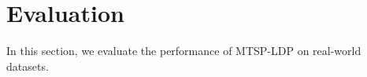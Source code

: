 \section{Evaluation} \label{sec:Evaluation}

In this section, we evaluate the performance of MTSP-LDP on real-world datasets.







